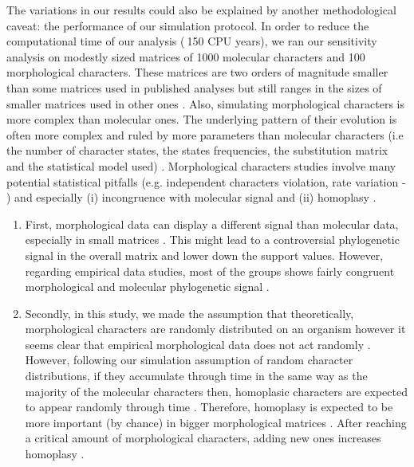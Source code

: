 \documentclass[12pt,letterpaper]{article}
\begin{document}
The variations in our results could also be explained by another methodological caveat: 
the performance of our simulation protocol. In order to reduce the computational time of our analysis ($~$150 CPU years), we ran our sensitivity analysis on modestly sized matrices of 1000 molecular characters and 100 morphological characters. These matrices are two orders of magnitude smaller than some matrices used in published analyses \citep[e.g.][]{springermacroevolutionary2012,nithe2013} but still ranges in the sizes of smaller matrices used in other ones \citep[e.g.][]{sallam2011craniodental,kellymolecular2014}. %
Also, simulating morphological characters is more complex than molecular ones. The underlying pattern of their evolution is often more complex and ruled by more parameters than molecular characters (i.e the number of character states, the states frequencies, the substitution matrix and the statistical model used) \citep{Pagel22011994,wagner2000,lewisa2001,wrightbayesian2014}. Morphological characters studies involve many potential statistical pitfalls (e.g. independent characters violation, rate variation - \citet{davalosintegrating2014}) and especially (i) incongruence with molecular signal and (ii) homoplasy \citep{wagner2000}.
\begin{enumerate}
\item{First, morphological data can display a different signal than molecular data, especially in small matrices \citep{wagner2000}. %
This might lead to a controversial phylogenetic signal in the overall matrix and lower down the support values. However, regarding empirical data studies, most of the groups shows fairly congruent morphological and molecular phylogenetic signal \citep[e.g.][]{leerates2013}.}
\item{Secondly, in this study, we made the assumption that theoretically, morphological characters are randomly distributed on an organism however it seems clear that empirical morphological data does not act randomly \citep{sansomfossilization2013,pattinsonphylogeny2014}. However, following our simulation assumption of random character distributions, if they accumulate through time in the same way as the majority of the molecular characters then, homoplasic characters are expected to appear randomly through time \citep{davalosintegrating2014}. Therefore, homoplasy is expected to be more important (by chance) in bigger morphological matrices \citep{davalosintegrating2014}. After reaching a critical amount of morphological characters, adding new ones increases homoplasy \citep{wagner2000}.}
\end{enumerate}
\end{document}
